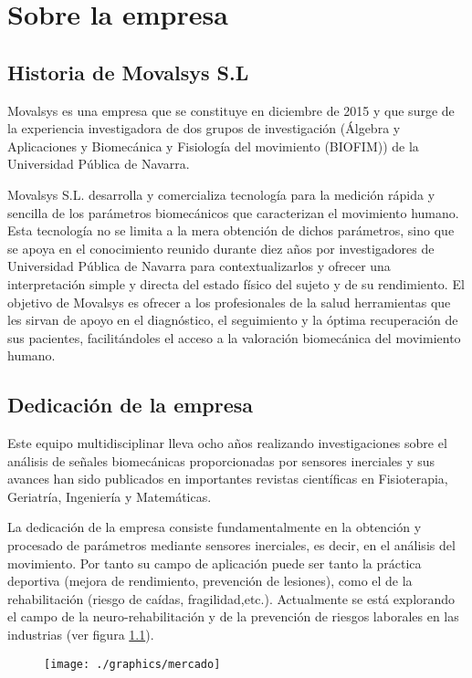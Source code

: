 \chapter{Sobre la empresa}

	\section{Historia de Movalsys S.L}
		Movalsys es una empresa que se constituye en diciembre de 2015 y que surge de la experiencia investigadora de dos grupos de investigación (Álgebra y Aplicaciones y Biomecánica y Fisiología del movimiento (BIOFIM)) de la Universidad Pública de Navarra. 
		
		Movalsys S.L. desarrolla y comercializa tecnología para la medición rápida y sencilla de los parámetros biomecánicos que caracterizan el movimiento humano. Esta tecnología no se limita a la mera obtención de dichos parámetros, sino que se apoya en el conocimiento reunido durante diez años por investigadores de Universidad Pública de Navarra para contextualizarlos y ofrecer una
		interpretación simple y directa del estado físico del sujeto y de su rendimiento.
		El objetivo de Movalsys es ofrecer a los profesionales de la salud herramientas que les sirvan de apoyo en el diagnóstico, el seguimiento y la óptima recuperación de sus pacientes, facilitándoles el acceso a la valoración biomecánica del movimiento humano.
	
	
	\section{Dedicación de la empresa}
	 
	Este equipo multidisciplinar lleva ocho años realizando investigaciones sobre el análisis de señales biomecánicas proporcionadas por sensores inerciales y sus avances han sido publicados en importantes revistas científicas en Fisioterapia, Geriatría, Ingeniería y Matemáticas.
	
	La dedicación de la empresa consiste fundamentalmente en la obtención y procesado de parámetros mediante sensores inerciales, es decir, en el análisis del movimiento. Por tanto su campo de aplicación puede ser tanto la práctica deportiva (mejora de rendimiento, prevención de lesiones), como el de la rehabilitación (riesgo de caídas, fragilidad,etc.). Actualmente se está explorando el campo de la neuro-rehabilitación y de la prevención de riesgos laborales en las industrias (ver figura \ref{mercado}). 
	 \begin{figure}[H]
	 	\centering
	 	\texttt{[image: ./graphics/mercado]}\label{mercado}
	 	
	 \end{figure}
